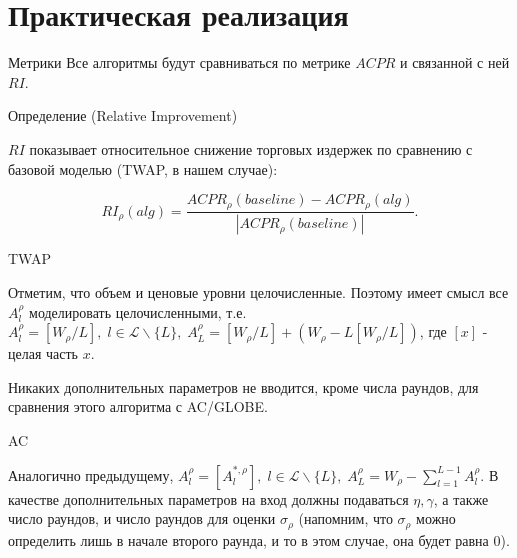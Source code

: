 \documentclass[aspectratio=169]{beamer}
\begin{document}
    \section{Практическая реализация}

        \begin{frame}{Метрики}
            Все алгоритмы будут сравниваться по метрике $ACPR$ и связанной с ней $RI$.

            \begin{block}{Определение (Relative Improvement)}

                $RI$ показывает относительное снижение торговых
                издержек по сравнению с базовой моделью (TWAP, в нашем случае):
        
                \begin{equation*}
                    RI_\rho(alg) = \frac{ACPR_\rho(baseline) - ACPR_{\rho}(alg)  }{|ACPR_\rho(baseline)|}.
                \end{equation*}
                
            \end{block}
            
        \end{frame}
        
        \begin{frame}{TWAP}
        
            Отметим, что объем и ценовые уровни целочисленные. Поэтому имеет смысл все $A^\rho_l$ моделировать целочисленными, т.е. $A^\rho_l = [W_\rho/L], \; l \in \mathcal L \backslash \{L\} , \; A^\rho_L = [W_\rho/L] + (W_\rho - L[W_\rho/L])$, где $[x]$ - целая часть $x$. 

            Никаких дополнительных параметров не вводится, кроме числа раундов, для сравнения этого алгоритма с AC/GLOBE.
            
        \end{frame}

        \begin{frame}{AC}

            Аналогично предыдущему, $A^\rho_l = [A_l^{*, \rho}], \; l \in \mathcal L \backslash \{L\} , \; A^\rho_L = W_\rho - \sum\limits_{l=1}^{L-1}A_l^\rho$. В качестве дополнительных параметров на вход должны подаваться $\eta, \gamma$, а также число раундов, и число раундов для оценки $\sigma_\rho$ (напомним, что $\sigma_\rho$ можно определить лишь в начале второго раунда, и то в этом случае, она будет равна 0). 

        \end{frame}
\end{document}
